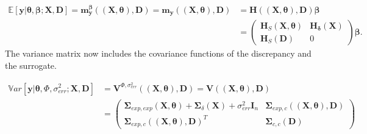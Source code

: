 \documentclass[soumission]{jsfds}
\begin{document}
\begin{equation}
\begin{split}
\mathbb{E}[\boldsymbol{y}|\boldsymbol{\theta},\boldsymbol{\beta};\boldsymbol{X},\boldsymbol{D}]=\boldsymbol{m}_{\boldsymbol{y}}^{\boldsymbol{\beta}}((\boldsymbol{X},\boldsymbol{\theta}),\boldsymbol{D}) = \boldsymbol{m}_{\boldsymbol{y}}((\boldsymbol{X},\boldsymbol{\theta}),\boldsymbol{D})& =\boldsymbol{H}((\boldsymbol{X},\boldsymbol{\theta}),\boldsymbol{D})\boldsymbol{\beta}\\&=\begin{pmatrix}
\boldsymbol{H}_S(\boldsymbol{X},\boldsymbol{\theta}) & \boldsymbol{H}_{\boldsymbol{\delta}}(\boldsymbol{X})\\
\boldsymbol{H}_S(\boldsymbol{D}) & 0
\end{pmatrix}\boldsymbol{\beta}.
\end{split}
\label{eq:MeanFullLikelihood}
\end{equation}
The variance matrix now includes the covariance functions of the discrepancy and the surrogate.

\begin{equation}
\begin{split}
\mathbb{V}ar[\boldsymbol{y}|\boldsymbol{\theta},\Phi,\sigma_{err}^2;\boldsymbol{X},\boldsymbol{D}]&=\boldsymbol{V}^{\Phi,\sigma_{err}^2}((\boldsymbol{X},\boldsymbol{\theta}),\boldsymbol{D})=\boldsymbol{V}((\boldsymbol{X},\boldsymbol{\theta}),\boldsymbol{D})\\&=\begin{pmatrix}
 \boldsymbol{\Sigma}_{exp,exp}(\boldsymbol{X},\boldsymbol{\theta}) +\boldsymbol{\Sigma}_{\delta}(\boldsymbol{X}) +\sigma_{err}^2\boldsymbol{I}_n &  \boldsymbol{\Sigma}_{exp,c}((\boldsymbol{X},\boldsymbol{\theta}),\boldsymbol{D})\\
 \boldsymbol{\Sigma}_{exp,c}((\boldsymbol{X},\boldsymbol{\theta}),\boldsymbol{D})^T & \boldsymbol{\Sigma}_{c,c}(\boldsymbol{D})
\end{pmatrix}
\end{split}
\label{eq:VarianceFullLikelihood}
\end{equation}
\end{document}
